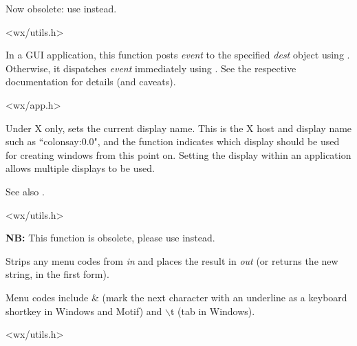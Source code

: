 Now obsolete: use  instead.


<wx/utils.h>

\label{wxpostevent}


In a GUI application, this function posts {\it event} to the specified {\it dest}
object using .
Otherwise, it dispatches {\it event} immediately using
.
See the respective documentation for details (and caveats).


<wx/app.h>

\label{wxsetdisplayname}


Under X only, sets the current display name. This is the X host and display name such
as ``colonsay:0.0", and the function indicates which display should be used for creating
windows from this point on. Setting the display within an application allows multiple
displays to be used.

See also .


<wx/utils.h>

\label{wxstripmenucodes}



{\bf NB:} This function is obsolete, please use 
 instead.

Strips any menu codes from {\it in} and places the result
in {\it out} (or returns the new string, in the first form).

Menu codes include \& (mark the next character with an underline
as a keyboard shortkey in Windows and Motif) and $\backslash$t (tab in Windows).


<wx/utils.h>

